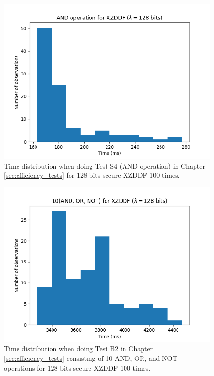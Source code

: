 \begin{figure}[ht]
    \centering
    \includegraphics[width=0.8\linewidth]{data/figures/XZDDF_STD128_AND_operation.png}
    \caption{Time distribution when doing Test S4 (AND operation) in Chapter \ref{sec:efficiency_tests} for 128 bits secure XZDDF 100 times.}
    \label{fig:distr_xzddf128_and}
\end{figure}

\begin{figure}[ht]
    \centering
    \includegraphics[width=0.8\linewidth]{data/figures/XZDDF_STD128_10AND_OR_NOT.png}
    \caption{Time distribution when doing Test B2 in Chapter \ref{sec:efficiency_tests} consisting of 10 AND, OR, and NOT operations for 128 bits secure XZDDF 100 times.}
    \label{fig:distr_xzddf128_10}
\end{figure}







